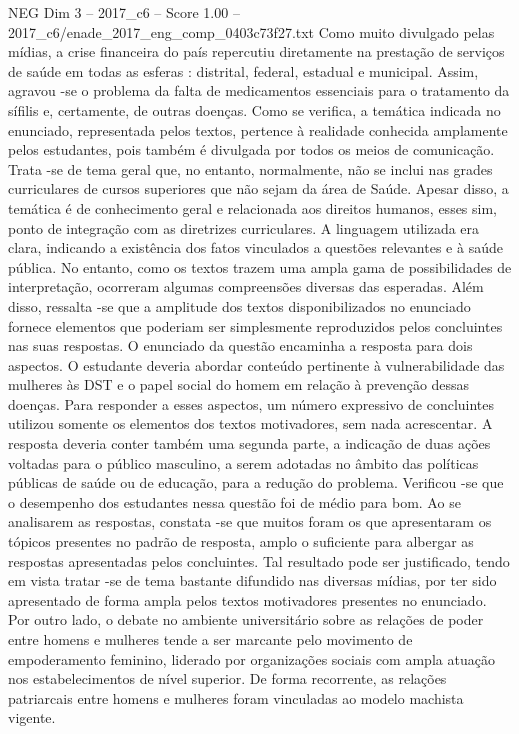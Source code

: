 \begin{textsample}{NEG Dim 3 – 2017\_c6 – Score 1.00 – 2017\_c6/enade\_2017\_eng\_comp\_0403c73f27.txt}
Como muito divulgado pelas mídias, a crise financeira do país repercutiu diretamente na prestação de serviços de saúde em todas as esferas : distrital, federal, estadual e municipal.
Assim, agravou -se o problema da falta de medicamentos essenciais para o tratamento da sífilis e, certamente, de outras doenças.
Como se verifica, a temática indicada no enunciado, representada pelos textos, pertence à realidade conhecida amplamente pelos estudantes, pois também é divulgada por todos os meios de comunicação.
Trata -se de tema geral que, no entanto, normalmente, não se inclui nas grades curriculares de cursos superiores que não sejam da área de Saúde.
Apesar disso, a temática é de conhecimento geral e relacionada aos direitos humanos, esses sim, ponto de integração com as diretrizes curriculares.
A linguagem utilizada era clara, indicando a existência dos fatos vinculados a questões relevantes e à saúde pública.
No entanto, como os textos trazem uma ampla gama de possibilidades de interpretação, ocorreram algumas compreensões diversas das esperadas.
Além disso, ressalta -se que a amplitude dos textos disponibilizados no enunciado fornece elementos que poderiam ser simplesmente reproduzidos pelos concluintes nas suas respostas.
O enunciado da questão encaminha a resposta para dois aspectos.
O estudante deveria abordar conteúdo pertinente à vulnerabilidade das mulheres às DST e o papel social do homem em relação à prevenção dessas doenças.
Para responder a esses aspectos, um número expressivo de concluintes utilizou somente os elementos dos textos motivadores, sem nada acrescentar.
A resposta deveria conter também uma segunda parte, a indicação de duas ações voltadas para o público masculino, a serem adotadas no âmbito das políticas públicas de saúde ou de educação, para a redução do problema.
Verificou -se que o desempenho dos estudantes nessa questão foi de médio para bom.
Ao se analisarem as respostas, constata -se que muitos foram os que apresentaram os tópicos presentes no padrão de resposta, amplo o suficiente para albergar as respostas apresentadas pelos concluintes.
Tal resultado pode ser justificado, tendo em vista tratar -se de tema bastante difundido nas diversas mídias, por ter sido apresentado de forma ampla pelos textos motivadores presentes no enunciado.
Por outro lado, o debate no ambiente universitário sobre as relações de poder entre homens e mulheres tende a ser marcante pelo movimento de empoderamento feminino, liderado por organizações sociais com ampla atuação nos estabelecimentos de nível superior.
De forma recorrente, as relações patriarcais entre homens e mulheres foram vinculadas ao modelo machista vigente.

\end{textsample}
